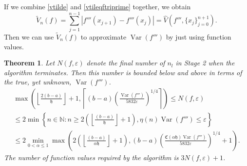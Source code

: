 \documentclass{iitthesis}
\DeclareMathOperator{\Var}{Var}
\newtheorem{theorem}{Theorem}
\theoremstyle{definition}
\theoremstyle{remark}
\begin{document}
If we combine \eqref{vtilde} and \eqref{vtileqftriprime} together, we obtain
\begin{equation}\label{vtileqvhat}
    \widetilde{V}_n(f)=\sum_{j=1}^{n-1}\left|f'''(x_{j+1})-f'''(x_{j})\right|=\widehat{V}(f''',\{x_j\}_{j=0}^{n+1}).
\end{equation}
Then we can use $\widetilde{V}_n(f)$ to approximate $\Var(f''')$ by just using function values.


\begin{theorem}\label{uppbndcost}
    Let $N(f,\varepsilon)$ denote the final number of $n_l$ in Stage 2 when the algorithm terminates. Then this number is bounded below and above in terms of the true, yet unknown, $\Var(f''')$.
    \begin{multline}\label{uppbndcostineq}
        \max\left(\left\lfloor\frac{2(b-a)}{\mathfrak{h}}\right\rfloor+1,\left\lceil(b-a)\left(\frac{\Var(f''')}{5832\varepsilon}\right)^{1/4}\right\rceil\right)\leq N(f,\varepsilon)\\ \leq 2\min\left\{n\in\mathbb{N}:n\geq2\left(\left\lfloor\frac{(b-a)}{\mathfrak{h}}\right\rfloor+1\right),\eta(n)\Var(f''')\leq\varepsilon\right\}\\ \leq 2\min_{0<\alpha\leq1}\max\left(2\left(\left\lfloor\frac{(b-a)}{\alpha\mathfrak{h}}\right\rfloor+1\right),(b-a)\left(\frac{\mathfrak{C}(\alpha\mathfrak{h})\Var(f''')}{5832\varepsilon}\right)^{1/4}+1\right).
    \end{multline}
    The number of function values required by the algorithm is $3N(f,\varepsilon)+1$.
\end{theorem}
\end{document}
